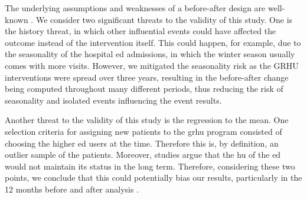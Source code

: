 \documentclass{bmcart}
\begin{document}
The underlying assumptions and weaknesses of a before-after design are well-known \cite{noauthor_guide_2020}.
We consider two significant threats to the validity of this study.
One is the history threat, in which other influential events could have affected the outcome instead of the intervention itself. 
This could happen, for example, due to the seasonality of the hospital \gls{ed} admissions, in which the winter season usually comes with more visits. 
However, we mitigated the seasonality risk as the GRHU interventions were spread over three years, resulting in the before-after change being computed throughout many different periods, thus reducing the risk of seasonality and isolated events influencing the event results.
\par Another threat to the validity of this study is the regression to the mean.
One selection criteria for assigning new patients to the \gls{grhu} program consisted of choosing the higher \gls{ed} users at the time.
Therefore this is, by definition, an outlier sample of the patients.
Moreover, studies argue that the \gls{hu} of the \gls{ed} would not maintain its status in the long term.
Therefore, considering these two points, we conclude that this could potentially bias our results, particularly in the 12 months before and after analysis \cite{lacalle_frequent_2010}. 
\end{document}
